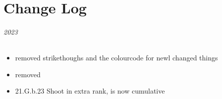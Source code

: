 \part{Change Log}
\label{change_log}

\paragraph{2023}
\begin{itemize}
	\item removed strikethoughs and the colourcode for newl changed things
	\item removed 
	\item 21.G.b.23 Shoot in extra rank, is now cumulative
\end{itemize}

